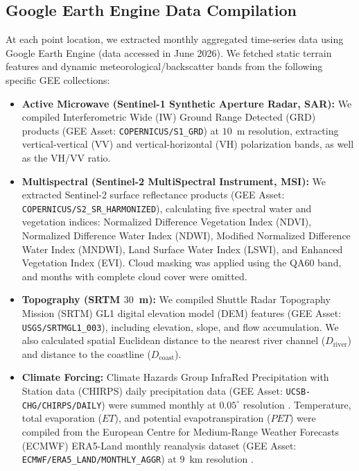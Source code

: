 \documentclass[12pt, a4paper]{article}
\begin{document}
\subsection{Google Earth Engine Data Compilation}
At each point location, we extracted monthly aggregated time-series data using Google Earth Engine \citep{Amani2020Google} (data accessed in June 2026). We fetched static terrain features and dynamic meteorological/backscatter bands from the following specific GEE collections:
\begin{itemize}
    \item \textbf{Active Microwave (Sentinel-1 Synthetic Aperture Radar, SAR):} We compiled Interferometric Wide (IW) Ground Range Detected (GRD) products (GEE Asset: \verb|COPERNICUS/S1_GRD|) at $10$~m resolution, extracting vertical-vertical (VV) and vertical-horizontal (VH) polarization bands, as well as the VH/VV ratio. 
    \item \textbf{Multispectral (Sentinel-2 MultiSpectral Instrument, MSI):} We extracted Sentinel-2 surface reflectance products (GEE Asset: \verb|COPERNICUS/S2_SR_HARMONIZED|), calculating five spectral water and vegetation indices: Normalized Difference Vegetation Index (NDVI), Normalized Difference Water Index (NDWI), Modified Normalized Difference Water Index (MNDWI), Land Surface Water Index (LSWI), and Enhanced Vegetation Index (EVI). Cloud masking was applied using the QA60 band, and months with complete cloud cover were omitted.
    \item \textbf{Topography (SRTM $30$~m):} We compiled Shuttle Radar Topography Mission (SRTM) GL1 digital elevation model (DEM) features (GEE Asset: \verb|USGS/SRTMGL1_003|), including elevation, slope, and flow accumulation. We also calculated spatial Euclidean distance to the nearest river channel ($D_{\text{river}}$) and distance to the coastline ($D_{\text{coast}}$).
    \item \textbf{Climate Forcing:} Climate Hazards Group InfraRed Precipitation with Station data (CHIRPS) daily precipitation data (GEE Asset: \verb|UCSB-CHG/CHIRPS/DAILY|) were summed monthly at $0.05^\circ$ resolution \citep{Funk2015The}. Temperature, total evaporation ($ET$), and potential evapotranspiration ($PET$) were compiled from the European Centre for Medium-Range Weather Forecasts (ECMWF) ERA5-Land monthly reanalysis dataset (GEE Asset: \verb|ECMWF/ERA5_LAND/MONTHLY_AGGR|) at $9$~km resolution \citep{MuñozSabater2021ERA5Land}.
\end{itemize}
\end{document}
